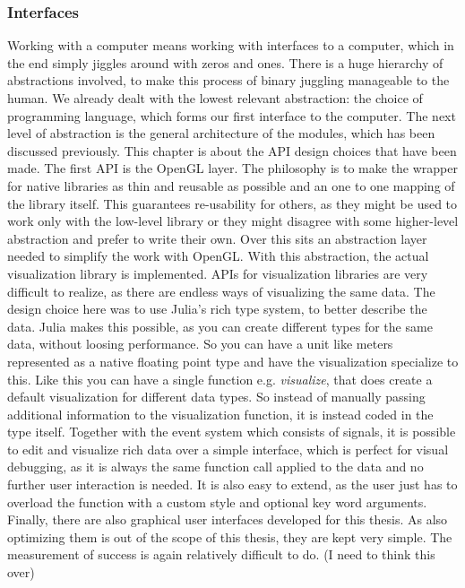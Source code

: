 \subsubsection{Interfaces}
Working with a computer means working with interfaces to a computer, which in the end simply jiggles around with zeros and ones. There is a huge hierarchy of abstractions involved, to make this process of binary juggling manageable to the human.
We already dealt with the lowest relevant abstraction: the choice of programming language, which forms our first interface to the computer.
The next level of abstraction is the general architecture of the modules, which has been discussed previously. 
This chapter is about the API design choices that have been made.
The first API is the \ac{OpenGL} layer. The philosophy is to make the wrapper for native libraries as thin and reusable as possible and an one to one mapping of the library itself.
This guarantees re-usability for others, as they might be used to work only with the low-level library or they might disagree with some higher-level abstraction and prefer to write their own.
Over this sits an abstraction layer needed to simplify the work with \ac{OpenGL}.
With this abstraction, the actual visualization library is implemented.
APIs for visualization libraries are very difficult to realize, as there are endless ways of visualizing the same data.
The design choice here was to use Julia's rich type system, to better describe the data. 
Julia makes this possible, as you can create different types for the same data, without loosing performance.
So you can have a unit like meters represented as a native floating point type and have the visualization specialize to this.
Like this you can have a single function e.g. \textit{visualize}, that does create a default visualization for different data types. So instead of manually passing additional information to the visualization function, it is instead coded in the type itself.
Together with the event system which consists of signals, it is possible to edit and visualize rich data over a simple interface, which is perfect for visual debugging, as it is always the same function call applied to the data and no further user interaction is needed.
It is also easy to extend, as the user just has to overload the function with a custom style and optional key word arguments.
Finally, there are also graphical user interfaces developed for this thesis. As also optimizing them is out of the scope of this thesis, they are kept very simple.
The measurement of success is again relatively difficult to do. (I need to think this over)

